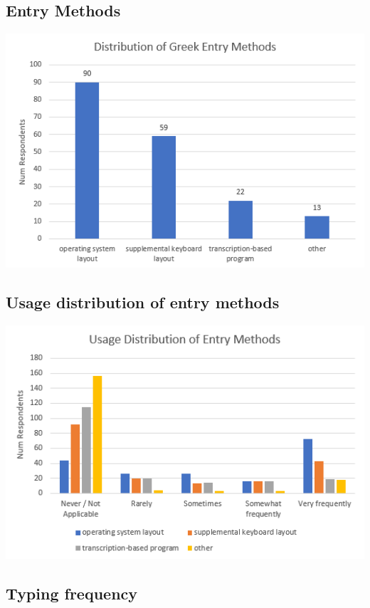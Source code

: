 \documentclass[11pt]{article}
\begin{document}
\subsection{Entry Methods}
\label{sec:orge7cbf6b}

\begin{center}
\includegraphics[width=.9\linewidth]{./images/entry-methods.PNG}
\end{center}

\subsection{Usage distribution of entry methods}
\label{sec:org1c885aa}

\begin{center}
\includegraphics[width=.9\linewidth]{./images/entry-method-usage-distribution.PNG}
\end{center}

\subsection{Typing frequency}
\label{sec:org17a216d}
\end{document}
